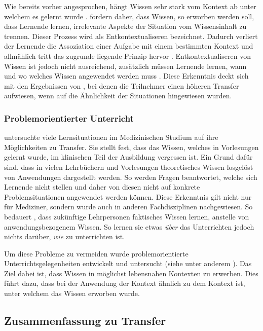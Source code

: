 Wie bereits vorher angesprochen, hängt Wissen sehr stark vom Kontext ab unter welchem es gelernt wurde \citep{Godden1975,Schoenfeld1988}. \citet{Anderson1996} fordern daher, dass Wissen, so erworben werden soll, dass Lernende lernen, irrelevante Aspekte der Situation vom Wissensinhalt zu trennen. Dieser Prozess wird als Entkontextualiseren bezeichnet. Dadurch verliert der Lernende die Assoziation einer Aufgabe mit einem bestimmten Kontext und allmählich tritt das zugrunde liegende Prinzip hervor \citet{Perkins1989}. Entkontextualiseren von Wissen ist jedoch nicht ausreichend, zusätzlich müssen Lernende lernen, wann und wo welches Wissen angewendet werden muss \citet{Wiggins1993}. Diese Erkenntnis deckt sich mit den Ergebnissen von \citet{Gick1980}, bei denen die Teilnehmer einen höheren Transfer aufwiesen, wenn auf die Ähnlichkeit der Situationen hingewiesen wurden.


\subsubsection{Problemorientierter Unterricht}

\citet{Williams1992} untersuchte viele Lernsituationen im Medizinischen Studium auf ihre Möglichkeiten zu Transfer. Sie stellt fest, dass das Wissen, welches in Vorlesungen gelernt wurde, im klinischen Teil der Ausbildung vergessen ist. Ein Grund dafür sind, dass in vielen Lehrbüchern und Vorlesungen theoretisches Wissen losgelöst von Anwendungen dargestellt werden. So werden Fragen beantwortet, welche sich Lernende nicht stellen und daher von diesen nicht auf konkrete Problemsituationen angewendet werden können.
Diese Erkenntnis gilt nicht nur für Mediziner, sondern wurde auch in anderen Fachdisziplinen nachgewiesen. So bedauert \citet{Shuell1996}, dass zukünftige Lehrpersonen faktisches Wissen lernen, anstelle von anwendungsbezogenem Wissen. So lernen sie etwas \textit{über} das Unterrichten jedoch nichts darüber, \textit{wie} zu unterrichten ist.

Um diese Probleme zu vermeiden wurde problemorientierte Unterrichtsgelegenheiten entwickelt und untersucht (siehe unter anderem \citet{Barrows1985,Michael1993,Shuell1996,Corte2003,Reusser2005,Fassler2007,Pea2013b}). Das Ziel dabei ist, dass Wissen in möglichst lebensnahen Kontexten zu erwerben. Dies führt dazu, dass bei der Anwendung der Kontext ähnlich zu dem Kontext ist, unter welchem das Wissen erworben wurde.

\subsection{Zusammenfassung zu Transfer}

